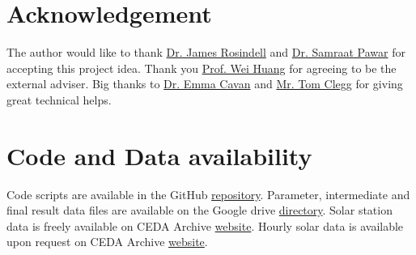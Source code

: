 \documentclass[../thesis.tex]{subfiles} %
\begin{document}
\section{Acknowledgement}
The author would like to thank \href{mailto:j.rosindell@imperial.ac.uk}{Dr. James Rosindell} and \href{mailto:s.pawar@imperial.ac.uk}{Dr. Samraat Pawar} for accepting this project idea.  Thank you \href{mailto:wei.huang@eng.ox.ac.uk}{Prof. Wei Huang} for agreeing to be the external adviser.  Big thanks to \href{mailto:e.cavan@imperial.ac.uk}{Dr. Emma Cavan} and \href{mailto:t.clegg17@imperial.ac.uk}{Mr. Tom Clegg} for giving great technical helps.

\section{Code and Data availability}
Code scripts are available in the GitHub \href{https://github.com/ph-u/Project}{repository}.  Parameter, intermediate and final result data files are available on the Google drive \href{https://drive.google.com/drive/folders/1tp2miPXis7bn-km1THC3ZaRHSRXQGCi5?usp=sharing}{directory}.  Solar station data is freely available on CEDA Archive \href{http://archive.ceda.ac.uk/midas_stations/google_earth/}{website}.  Hourly solar data is available upon request on CEDA Archive \href{https://catalogue.ceda.ac.uk/uuid/220a65615218d5c9cc9e4785a3234bd0}{website}.
\end{document}
